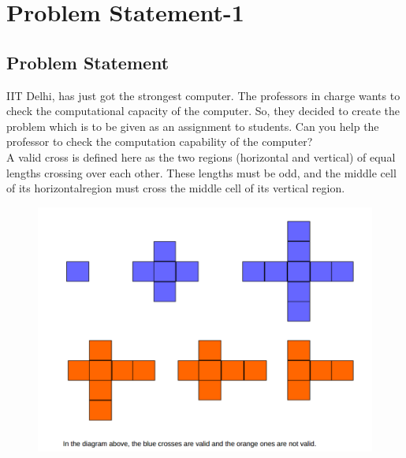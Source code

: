 \documentclass[12pt]{article}
\begin{document}

\newpage
\tableofcontents
\newpage
\listoffigures
\newpage



\section{Problem Statement-1}

\subsection{Problem Statement}
IIT Delhi, has just got the strongest computer. The professors in charge wants to check the computational capacity of the computer. So, they decided to create the problem which is to be given as an assignment to students. Can you help the professor to check the computation capability of the computer?\\
A valid cross is defined here as the two regions (horizontal and vertical) of equal lengths crossing over each other. These lengths must be odd, and the middle cell of its horizontalregion must cross the middle cell of its vertical region.\\

\begin{figure}[h]
\begin{center}
\includegraphics[scale=0.5]{dig.png}
\end{center}
\end{figure}
\end{document}
